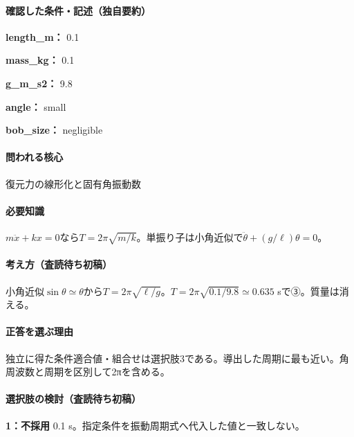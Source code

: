 \paragraph{確認した条件・記述（独自要約）}\mbox{}\par

\noindent\textbf{length\_m：} 0.1\par

\noindent\textbf{mass\_kg：} 0.1\par

\noindent\textbf{g\_m\_s2：} 9.8\par

\noindent\textbf{angle：} small\par

\noindent\textbf{bob\_size：} negligible\par

\paragraph{問われる核心} 復元力の線形化と固有角振動数

\paragraph{必要知識} \(m\ddot x+kx=0\)なら\(T=2\pi\sqrt{m/k}\)。単振り子は小角近似で\(\ddot\theta+(g/\ell)\theta=0\)。

\paragraph{考え方（査読待ち初稿）} 小角近似\(\sin\theta\simeq\theta\)から\(T=2\pi\sqrt{\ell/g}\)。\(T=2\pi\sqrt{0.1/9.8}\simeq0.635\) sで③。質量は消える。

\paragraph{正答を選ぶ理由} 独立に得た条件適合値・組合せは選択肢3である。導出した周期に最も近い。角周波数と周期を区別して2πを含める。

\paragraph{選択肢の検討（査読待ち初稿）}\mbox{}\par

\noindent\textbf{1：不採用} 0.1 s。指定条件を振動周期式へ代入した値と一致しない。\par

